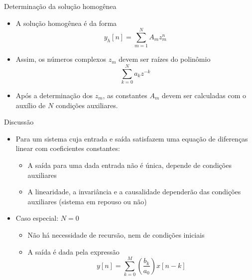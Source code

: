 \begin{slide}[toc=]{Determinação da solução homogênea}
   \begin{itemize}
      \item A solução homogênea é da forma
      \begin{equation*}
         y_h[n]=\sum_{m=1}^N A_m z_m^n
      \end{equation*}
      \item Assim, os números complexos $z_m$ devem ser raízes do polinômio
      \begin{equation*}
         \sum_{k=0}^N a_k z^{-k}
      \end{equation*}
      \item Após a determinação dos $z_m$, as constantes $A_m$ devem ser calculadas com o auxílio 
      de $N$ condições auxiliares.
   \end{itemize}
\end{slide}

\begin{slide}[toc=]{Discussão}
   \begin{itemize}
      \item Para um sistema cuja entrada e saída satisfazem uma equação de 
      diferenças linear com coeficientes constantes:
      \begin{itemize}
         \item A saída para uma dada entrada não é única, depende de condições auxiliares
         \item A linearidade, a invariância e a causalidade dependerão das condições auxiliares 
         (sistema em repouso ou não)
      \end{itemize}
      \item Caso especial: $N=0$
      \begin{itemize}
         \item Não há necessidade de recursão, nem de condições iniciais
         \item A saída é dada pela expressão
         \begin{equation*}
            y[n]=\sum_{k=0}^M\left (\frac{b_k}{a_0}\right )x[n-k]
         \end{equation*}
      \end{itemize}
   \end{itemize}
\end{slide}

